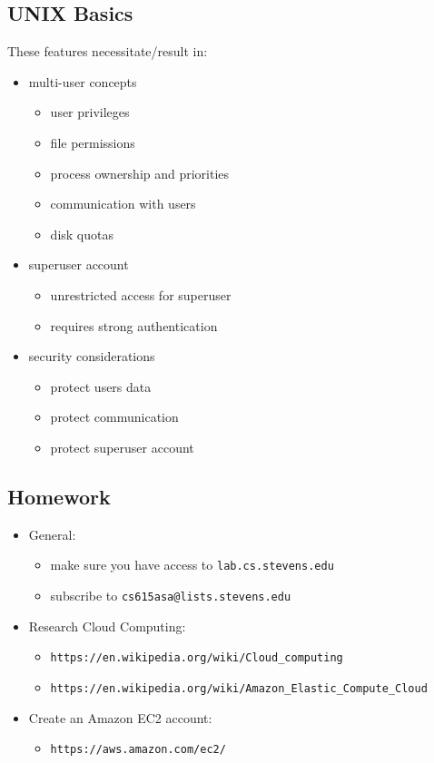 \documentclass[xga]{xdvislides}
\begin{document}
\subsection{UNIX Basics}
These features necessitate/result in:
\begin{itemize}
	\item multi-user concepts
		\begin{itemize}
			\item user privileges
			\item file permissions
			\item process ownership and priorities
			\item communication with users
			\item disk quotas
		\end{itemize}
	\item superuser account
		\begin{itemize}
			\item unrestricted access for superuser
			\item requires strong authentication
		\end{itemize}
	\item security considerations
		\begin{itemize}
			\item protect users data
			\item protect communication
			\item protect superuser account
		\end{itemize}
\end{itemize}

\subsection{Homework}
\begin{itemize}
	\item General:
		\begin{itemize}
			\item make sure you have access to \verb+lab.cs.stevens.edu+
			\item subscribe to \verb+cs615asa@lists.stevens.edu+
		\end{itemize}
		\vspace{.5in}

	\item Research Cloud Computing:
		\begin{itemize}
			\item \verb+https://en.wikipedia.org/wiki/Cloud_computing+
			\item \verb+https://en.wikipedia.org/wiki/Amazon_Elastic_Compute_Cloud+
		\end{itemize}
		\vspace{.5in}

	\item Create an Amazon EC2 account:
		\begin{itemize}
			\item \verb+https://aws.amazon.com/ec2/+
		\end{itemize}
\end{itemize}
\end{document}
